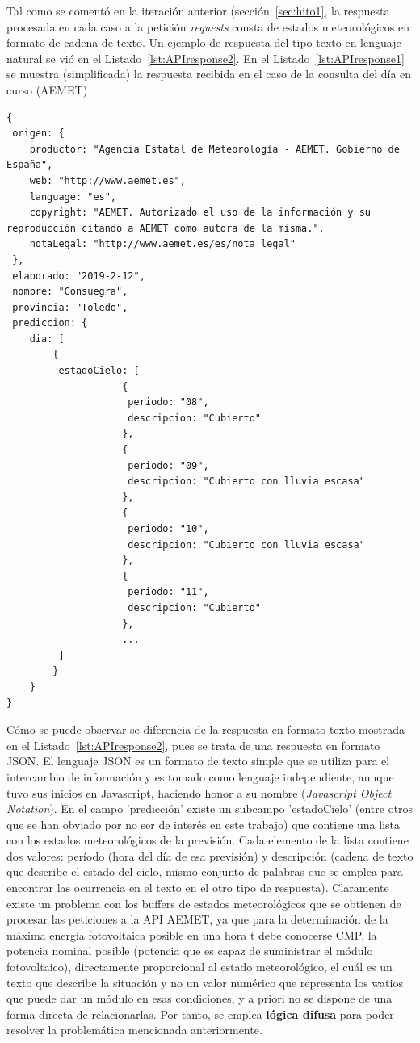 Tal como se comentó en la iteración anterior (sección~\ref{sec:hito1}, la respuesta procesada en cada caso a la petición \textit{requests} consta de estados meteorológicos en formato de cadena de texto. Un ejemplo de respuesta del tipo texto en lenguaje natural se vió en el Listado~\ref{lst:APIresponse2}. En el Listado~\ref{lst:APIresponse1} se muestra (simplificada) la respuesta recibida en el caso de la consulta del día en curso (\textcopyright AEMET)
\begin{lstlisting}[numbers=none,float=ht,caption={Ejemplo de respuesta de la API-AEMET para el día en curso},label={lst:APIresponse1}]
{
 origen: {
	productor: "Agencia Estatal de Meteorología - AEMET. Gobierno de España",
	web: "http://www.aemet.es",
	language: "es",
	copyright: "AEMET. Autorizado el uso de la información y su reproducción citando a AEMET como autora de la misma.",
	notaLegal: "http://www.aemet.es/es/nota_legal"
 },
 elaborado: "2019-2-12",
 nombre: "Consuegra",
 provincia: "Toledo",
 prediccion: {
 	dia: [
		{
		 estadoCielo: [
					{
					 periodo: "08",
					 descripcion: "Cubierto"
					},
					{
					 periodo: "09",
					 descripcion: "Cubierto con lluvia escasa"
					},
					{
					 periodo: "10",
					 descripcion: "Cubierto con lluvia escasa"
					},
					{
					 periodo: "11",
					 descripcion: "Cubierto"
					},
					...
		 ]
		}
	}
}
\end{lstlisting}
Cómo se puede observar se diferencia de la respuesta en formato texto mostrada en el Listado~\ref{lst:APIresponse2}, pues se trata de una respuesta en formato \gls{JSON}. El lenguaje \gls{JSON} es un formato de texto simple que se utiliza para el intercambio de información y es tomado como lenguaje independiente, aunque tuvo sus inicios en Javascript, haciendo honor a su nombre (\textit{Javascript Object Notation}). En el campo 'predicción' existe un subcampo 'estadoCielo' (entre otros que se han obviado por no ser de interés en este trabajo) que contiene una lista con los estados meteorológicos de la previsión. Cada elemento de la lista contiene dos valores: período (hora del día de esa previsión) y descripción (cadena de texto que describe el estado del cielo, mismo conjunto de palabras que se emplea para encontrar las ocurrencia en el texto en el otro tipo de respuesta). Claramente existe un problema con los buffers de estados meteorológicos que se obtienen de procesar las peticiones a la \gls{API} \gls{AEMET}, ya que para la determinación de la máxima energía fotovoltaica posible en una hora t debe conocerse \gls{CMP}, la potencia nominal posible (potencia que es capaz de suministrar el módulo fotovoltaico), directamente proporcional al estado meteorológico, el cuál es un texto que describe la situación y no un valor numérico que representa los watios que puede dar un módulo en esas condiciones, y a priori no se dispone de una forma directa de relacionarlas. Por tanto, se emplea \textbf{lógica difusa} para poder resolver la problemática mencionada anteriormente.

